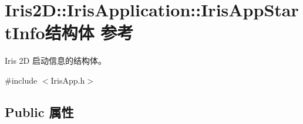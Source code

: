 \hypertarget{struct_iris2_d_1_1_iris_application_1_1_iris_app_start_info}{}\section{Iris2D\+:\+:Iris\+Application\+:\+:Iris\+App\+Start\+Info结构体 参考}
\label{struct_iris2_d_1_1_iris_application_1_1_iris_app_start_info}


Iris 2D 启动信息的结构体。  




{\ttfamily \#include $<$Iris\+App.\+h$>$}

\subsection*{Public 属性}
